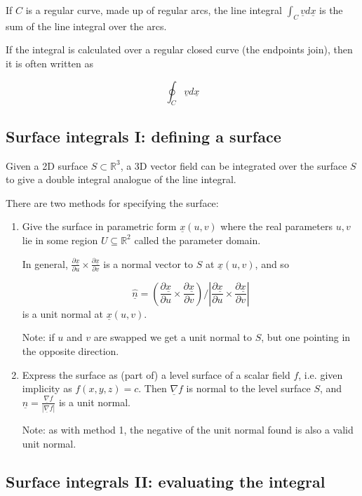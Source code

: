 \documentclass[12pt,a4paper]{article}
\theoremstyle{definition}
\begin{document}
If $C$ is a regular curve, made up of regular arcs, the line integral $\int_C \underline{v} d\underline{x}$ is the sum of the line integral over the arcs.

If the integral is calculated over a regular closed curve (the endpoints join), then it is often written as

\[\oint_C \underline{v} d\underline{x}\]

\subsection{Surface integrals I: defining a surface}


Given a 2D surface $S \subset \mathbb{R}^3$, a 3D vector field can be integrated over the surface $S$ to give a double integral analogue of the line integral.

There are two methods for specifying the surface:

\begin{enumerate}
	\item Give the surface in parametric form $\underline{x}(u, v)$ where the real parameters $u, v$ lie in some region $U \subseteq \mathbb{R}^2$ called the parameter domain.
	
	In general, $\frac{\partial \underline{x}}{\partial u} \times \frac{\partial \underline{x}}{\partial v}$ is a normal vector to $S$ at $\underline{x}(u, v)$, and so
	
	\[ \hat{\underline{n}} = \left( \frac{\partial \underline{x}}{\partial u} \times \frac{\partial \underline{x}}{\partial v} \right) / \left| \frac{\partial \underline{x}}{\partial u} \times \frac{\partial \underline{x}}{\partial v} \right| \] is a unit normal at $\underline{x}(u, v)$.

	Note: if $u$ and $v$ are swapped we get a unit normal to $S$, but one pointing in the opposite direction.
	\item Express the surface as (part of) a level surface of a scalar field $f$, i.e. given implicity as $f(x, y, z) = c$. Then $\underline{\nabla}f$ is normal to the level surface $S$, and $\hat{\underline{n}} = \frac{\underline{\nabla}f}{|\underline{\nabla}f|}$ is a unit normal.
	
	Note: as with method 1, the negative of the unit normal found is also a valid unit normal.
\end{enumerate}

\subsection{Surface integrals II: evaluating the integral}
\end{document}
